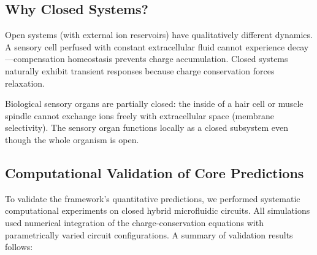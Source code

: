 \documentclass[twocolumn,10pt]{article}
\theoremstyle{remark}
\begin{document}
\subsection{Why Closed Systems?}

Open systems (with external ion reservoirs) have qualitatively different dynamics. A sensory cell perfused with constant extracellular fluid cannot experience decay---compensation homeostasis prevents charge accumulation. Closed systems naturally exhibit transient responses because charge conservation forces relaxation.

Biological sensory organs are partially closed: the inside of a hair cell or muscle spindle cannot exchange ions freely with extracellular space (membrane selectivity). The sensory organ functions locally as a closed subsystem even though the whole organism is open.

\subsection{Computational Validation of Core Predictions}

To validate the framework's quantitative predictions, we performed systematic computational experiments on closed hybrid microfluidic circuits. All simulations used numerical integration of the charge-conservation equations with parametrically varied circuit configurations. A summary of validation results follows:
\end{document}
